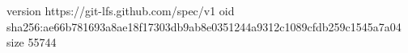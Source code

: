 version https://git-lfs.github.com/spec/v1
oid sha256:ae66b781693a8ae18f17303db9ab8e0351244a9312c1089cfdb259c1545a7a04
size 55744
